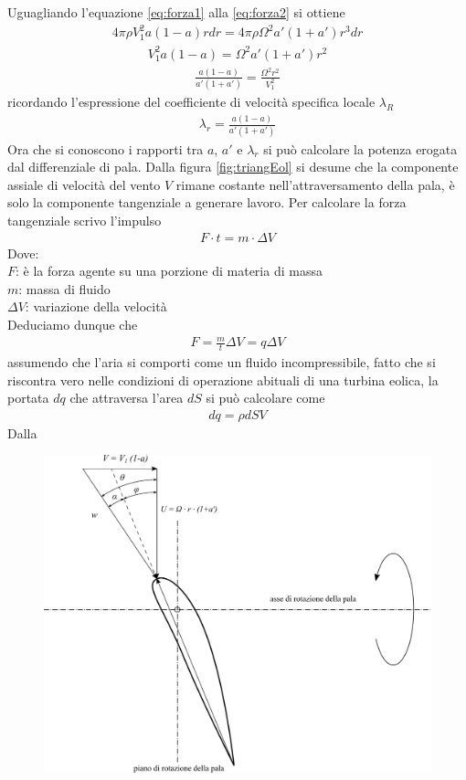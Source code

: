 Uguagliando l'equazione \ref{eq:forza1} alla \ref{eq:forza2} si ottiene
\begin{align*}
4 \pi \rho V_1^2 a \left( 1 - a \right) r dr = 4 \pi \rho \Omega^2 a' \left( 1 + a' \right) r^3 dr
\end{align*}
\begin{align*}
V_1^2 a \left( 1 - a \right) = \Omega^2 a' \left( 1 + a' \right) r^2
\end{align*}
\begin{align*}
\frac{a \left( 1 - a \right)}{a' \left(1 + a' \right)} = \frac{\Omega^2 r^2}{V_1^2}
\end{align*}
ricordando l'espressione del coefficiente di velocità specifica locale $\lambda_R$
\begin{align*}
\lambda_r = \frac{a \left(1 - a \right)}{a' \left( 1 + a' \right)}
\end{align*}
Ora che si conoscono i rapporti tra $a$, $a'$ e $\lambda_r$ si può calcolare la potenza erogata dal differenziale di pala. Dalla figura \ref{fig:triangEol} si desume che la componente assiale di velocità del vento $V$ rimane costante nell'attraversamento della pala, è solo la componente tangenziale a generare lavoro. Per calcolare la forza tangenziale scrivo l'impulso 
\begin{align*}
F \cdot t = m \cdot \Delta V
\end{align*}
Dove:\\[1mm]
$F$: è la forza agente su una porzione di materia di massa \\
$m$: massa di fluido\\ 
$\Delta V$: variazione della velocità\\[2mm]
Deduciamo dunque che
\begin{align*}
F = \frac{m}{t} \Delta V = q \Delta V
\end{align*}
assumendo che l'aria si comporti come un fluido incompressibile, fatto che si riscontra vero nelle condizioni di operazione abituali di una turbina eolica, la portata $dq$ che attraversa l'area $dS$ si può calcolare come 
\begin{align*}
dq = \rho dS V
\end{align*}
Dalla 



\begin{figure}
\centering
  \includegraphics[width=\textwidth]{fig/triangEol2.pdf}
\caption{}
\label{fig:triangEol2}
\end{figure}
